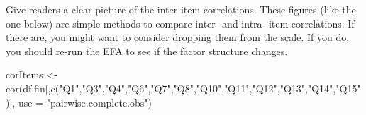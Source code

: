 \documentclass[
  letterpaper,
  DIV=11,
  numbers=noendperiod]{scrartcl}
\newenvironment{Shaded}{\begin{snugshade}}{\end{snugshade}}
\newcommand{\AttributeTok}[1]{\textcolor[rgb]{0.40,0.45,0.13}{#1}}
\newcommand{\FunctionTok}[1]{\textcolor[rgb]{0.28,0.35,0.67}{#1}}
\newcommand{\NormalTok}[1]{\textcolor[rgb]{0.00,0.23,0.31}{#1}}
\newcommand{\OtherTok}[1]{\textcolor[rgb]{0.00,0.23,0.31}{#1}}
\newcommand{\StringTok}[1]{\textcolor[rgb]{0.13,0.47,0.30}{#1}}
\begin{document}
Give readers a clear picture of the inter-item correlations. These
figures (like the one below) are simple methods to compare inter- and
intra- item correlations. If there are, you might want to consider
dropping them from the scale. If you do, you should re-run the EFA to
see if the factor structure changes.

\begin{Shaded}
\begin{Highlighting}[]
\NormalTok{corItems }\OtherTok{\textless{}{-}} \FunctionTok{cor}\NormalTok{(df.fin[,}\FunctionTok{c}\NormalTok{(}\StringTok{"Q1"}\NormalTok{,}\StringTok{"Q3"}\NormalTok{,}\StringTok{"Q4"}\NormalTok{,}\StringTok{"Q6"}\NormalTok{,}\StringTok{"Q7"}\NormalTok{,}\StringTok{"Q8"}\NormalTok{,}\StringTok{"Q10"}\NormalTok{,}\StringTok{"Q11"}\NormalTok{,}\StringTok{"Q12"}\NormalTok{,}\StringTok{"Q13"}\NormalTok{,}\StringTok{"Q14"}\NormalTok{,}\StringTok{"Q15"}\NormalTok{)], }\AttributeTok{use =} \StringTok{"pairwise.complete.obs"}\NormalTok{)}


\end{Highlighting}
\end{Shaded}
\end{document}
